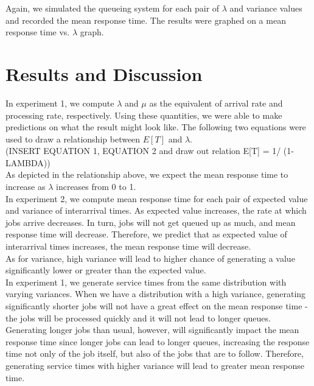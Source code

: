 \documentclass[12pt]{article}
\begin{document}
Again, we simulated the queueing system for each pair of $\lambda$ and variance values and recorded the mean response time. The results were graphed on a mean response time vs. $\lambda$ graph. 

\section{Results and Discussion} 
In experiment 1, we compute $\lambda$ and $\mu$ as the equivalent of arrival rate and processing rate, respectively. Using these quantities, we were able to make predictions on what the result might look like. The following two equations were used to draw a relationship between $E[T]$ and $\lambda$. \\

(INSERT EQUATION 1, EQUATION 2 and draw out relation E[T] = 1/ (1-LAMBDA)) \\ 

As depicted in the relationship above, we expect the mean response time to increase as $\lambda$ increases from 0 to 1. \\

In experiment 2, we compute mean response time for each pair of expected value and variance of interarrival times. As expected value increases, the rate at which jobs arrive decreases. In turn, jobs will not get queued up as much, and mean response time will decrease. Therefore, we predict that as expected value of interarrival times increases, the mean response time will decrease. \\

As for variance, high variance will lead to higher chance of generating a value significantly lower or greater than the expected value. \\

In experiment 1, we generate service times from the same distribution with varying variances. When we have a distribution with a high variance, generating significantly shorter jobs will not have a great effect on the mean response time - the jobs will be processed quickly and it will not lead to longer queues. Generating longer jobs than usual, however, will significantly impact the mean response time since longer jobs can lead to longer queues, increasing the response time not only of the job itself, but also of the jobs that are to follow. Therefore, generating service times with higher variance will lead to greater mean response time. \\ 
\end{document}
